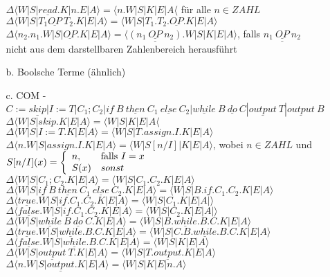 \begin{enumerate}
\begin{itemize}
	$\Delta\langle W|S|\underline{read}.K|n.E|A\rangle = \langle n.W|S|K|E|A\langle$ für alle $n\in ZAHL$\\
	$\Delta\langle W|S|T_1 \underline{OP}\ T_2.K|E|A\rangle = \langle W|S|T_1.T_2.\underline{OP}.K|E|A\rangle$\\
	$\Delta\langle n_2.n_1.W|S|\underline{OP}.K|E|A\rangle = \langle \underline{(n_1\ \underline{OP}\ n_2)}.W|S|K|E|A\rangle$, falls $\underline{n_1\ \underline{OP}\ n_2}$ nicht aus dem darstellbaren Zahlenbereich herausführt\\
	\item[b.] Boolsche Terme (ähnlich)
	\item[c.] COM  - $C:=\underline{skip}|I:=T|C_1;C_2|\underline{if}\ B\ \underline{then}\ C_1\ \underline{else}\ C_2|\underline{while}\ B\  \underline{do}\ C| \underline{output}\ T|\underline{output}\ B$\\
	$\Delta\langle W|S|skip.K|E|A\rangle = \langle W|S|K|E|A\langle$\\
	$\Delta\langle W|S|I:=T.K|E|A\rangle = \langle W|S|T.assign.I.K|E|A\rangle$\\
$\Delta\langle n.W|S|assign.I.K|E|A\rangle = \langle W|S[n/I]|K|E|A\rangle$, wobei $n\in ZAHL$ und $S[n/I](x) = \left\lbrace\begin{array}{l l}
n,&\text{falls }I =x\\
	S(x)& sonst\\
\end{array}\right.$
	$\Delta\langle W|S|C_1;C_2.K|E|A\rangle = \langle W|S|C_1.C_2.K|E|A\rangle$
	$\Delta\langle W|S|\underline{if}\ B\ \underline{then}\ C_1\ \underline{else}\ C_2.K|E|A\rangle = \langle W|S|B.\underline{if}.C_1.C_2.K|E|A\rangle$\\
	$\Delta\langle \underline{true}.W|S|\underline{if}.C_1.C_2.K|E|A\rangle = \langle W|S|C_1.K|E|A|\rangle$\\
	$\Delta\langle \underline{false}.W|S|\underline{if}.C_1.C_2.K|E|A\rangle = \langle W|S|C_2.K|E|A|\rangle$\\
	$\Delta\langle W|S|\underline{while}\ B\ \underline{do}\ C.K|E|A\rangle = \langle W|S|B.\underline{while}.B.C.K|E|A\rangle$\\
	$\Delta\langle \underline{true}.W|S|\underline{while}.B.C.K|E|A\rangle = \langle W|S|C.B.\underline{while}.B.C.K|E|A\rangle$\\
	$\Delta\langle \underline{false}.W|S|\underline{while}.B.C.K|E|A\rangle = \langle W|S|K|E|A\rangle$\\

	$\Delta\langle W|S|\underline{output}\ T.K|E|A\rangle = \langle W|S|T.\underline{output}.K|E|A\rangle$\\
	$\Delta\langle n.W|S|\underline{output}.K|E|A\rangle = \langle W|S|K|E|n.A\rangle$\\

	\end{itemize}

\end{enumerate}




